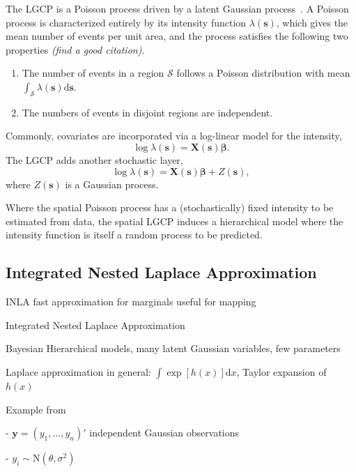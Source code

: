 \documentclass[]{interact}
\begin{document}
The LGCP is a Poisson process driven by a latent Gaussian
process~\cite{moelleretal}. A Poisson process is characterized entirely by its
intensity function \(\lambda(\mathbf{s})\), which gives the mean number of events
per unit area, and the process satisfies the following two properties
{\it (find a good citation)}.
\begin{enumerate}
\item The number of events in a region \(\mathcal{S}\) follows a Poisson
distribution with mean
\(\int_{\mathcal{S}} \lambda(\mathbf{s})\mathrm{d}\mathbf{s}\).
\item The numbers of events in disjoint regions are independent.
\end{enumerate}

Commonly, covariates are incorporated via a log-linear model for the intensity,
\begin{displaymath}
\log\lambda(\mathbf{s}) = \mathbf{X}(\mathbf{s}) \boldsymbol{\beta}.
\end{displaymath}
The LGCP adds another stochastic layer,
\begin{displaymath}
\log\lambda(\mathbf{s}) = \mathbf{X}(\mathbf{s}) \boldsymbol{\beta}
+ Z(\mathbf{s}),
\end{displaymath}
where \(Z(\mathbf{s})\) is a Gaussian process.

Where the spatial Poisson process has a (stochastically) fixed intensity to be
estimated from data, the spatial LGCP induces a hierarchical model where the
intensity function is itself a random process to be predicted.


\subsection{Integrated Nested Laplace Approximation}

INLA fast approximation for marginals useful for mapping \cite{rueetal}

Integrated Nested Laplace Approximation

Bayesian Hierarchical models, many latent Gaussian variables, few parameters

Laplace approximation in general: $\int \exp[h(x)]\mathrm{d}x$, Taylor expansion of $h(x)$

Example from \cite{rinla}

- $\mathbf{y} = (y_{1}, \dots, y_{n})'$ independent Gaussian observations

- $y_{i} \sim \mathrm{N}(\theta, \sigma^{2})$
\end{document}
